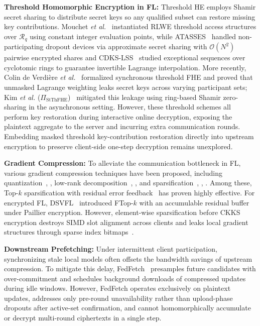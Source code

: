 \textbf{Threshold Homomorphic Encryption in FL:} Threshold HE employs Shamir secret sharing to distribute secret keys so any qualified subset can restore missing key contributions. Mouchet \emph{et al.}~\cite{mouchet2023threshold} instantiated RLWE threshold access structures over $\mathcal{R}_q$ using constant integer evaluation points, while ATASSES~\cite{chang2025atasses} handled non-participating dropout devices via approximate secret sharing with $\mathcal{O}(N^2)$ pairwise encrypted shares and CDKS-LSS~\cite{wang2026cdks} studied exceptional sequences over cyclotomic rings to guarantee invertible Lagrange interpolation. More recently, Colin de Verdi\`ere \emph{et al.}~\cite{colin2026tfhesd} formalized synchronous threshold FHE and proved that unmasked Lagrange weighting leaks secret keys across varying participant sets; Kim \emph{et al.} ($\Pi_{\mathrm{StThFHE}}$)~\cite{kim2026tfhead} mitigated this leakage using ring-based Shamir zero-sharing in the asynchronous setting. However, these threshold schemes all perform key restoration during interactive online decryption, exposing the plaintext aggregate to the server and incurring extra communication rounds. Embedding masked threshold key-contribution restoration directly into upstream encryption to preserve client-side one-step decryption remains unexplored.


\textbf{Gradient Compression:} To alleviate the communication bottleneck in FL, various gradient compression techniques have been proposed, including quantization~\cite{alistarh2017qsgd}, \cite{bao2025efskip}, low-rank decomposition~\cite{richtarik2024error}, \cite{dorfman2023docofl}, and sparsification~\cite{haddadpour2021federated}, \cite{kumar2023noniid}, \cite{kim2024spafl}. Among these, Top-$k$ sparsification with residual error feedback~\cite{stich2018sparsified} has proven highly effective. For encrypted FL, DSVFL~\cite{li2025enhancing} introduced FTop-$k$ with an accumulable residual buffer under Paillier encryption. However, element-wise sparsification before CKKS encryption destroys SIMD slot alignment across clients and leaks local gradient structures through sparse index bitmaps~\cite{xu2025harnessing}.


\textbf{Downstream Prefetching:} Under intermittent client participation, synchronizing stale local models often offsets the bandwidth savings of upstream compression. To mitigate this delay, FedFetch~\cite{yan2025fedfetch} presamples future candidates with over-commitment and schedules background downloads of compressed updates during idle windows. However, FedFetch operates exclusively on plaintext updates, addresses only pre-round unavailability rather than upload-phase dropouts after active-set confirmation, and cannot homomorphically accumulate or decrypt multi-round ciphertexts in a single step.

